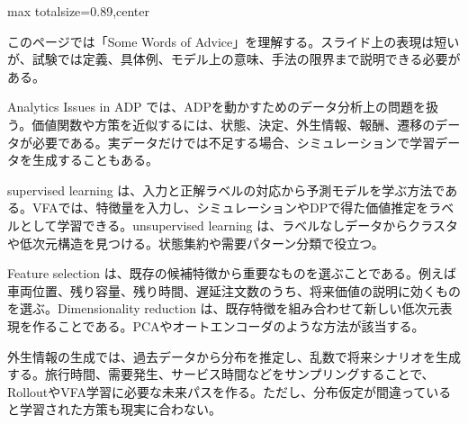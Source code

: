 \begin{minipage}[t]{0.58\textwidth}
\begin{adjustbox}{max totalsize={\textwidth}{0.89\textheight},center}
\begin{minipage}{\textwidth}\scriptsize
{}このページでは「Some Words of Advice」を理解する。スライド上の表現は短いが、試験では定義、具体例、モデル上の意味、手法の限界まで説明できる必要がある。\par
Analytics Issues in ADP では、ADPを動かすためのデータ分析上の問題を扱う。価値関数や方策を近似するには、状態、決定、外生情報、報酬、遷移のデータが必要である。実データだけでは不足する場合、シミュレーションで学習データを生成することもある。\par
supervised learning は、入力と正解ラベルの対応から予測モデルを学ぶ方法である。VFAでは、特徴量を入力し、シミュレーションやDPで得た価値推定をラベルとして学習できる。unsupervised learning は、ラベルなしデータからクラスタや低次元構造を見つける。状態集約や需要パターン分類で役立つ。\par
Feature selection は、既存の候補特徴から重要なものを選ぶことである。例えば車両位置、残り容量、残り時間、遅延注文数のうち、将来価値の説明に効くものを選ぶ。Dimensionality reduction は、既存特徴を組み合わせて新しい低次元表現を作ることである。PCAやオートエンコーダのような方法が該当する。\par
外生情報の生成では、過去データから分布を推定し、乱数で将来シナリオを生成する。旅行時間、需要発生、サービス時間などをサンプリングすることで、RolloutやVFA学習に必要な未来パスを作る。ただし、分布仮定が間違っていると学習された方策も現実に合わない。\par

\end{minipage}
\end{adjustbox}
\end{minipage}
